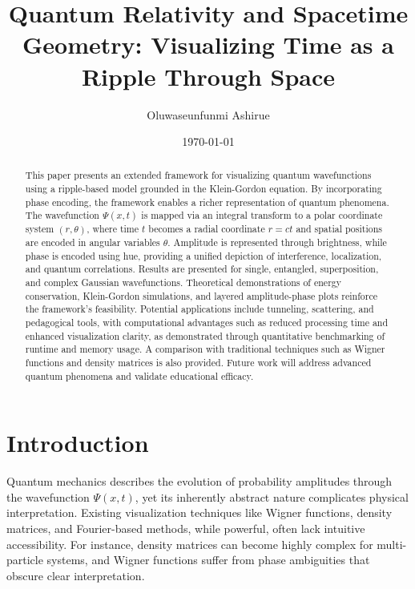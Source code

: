 \documentclass[12pt]{article}
\title{Quantum Relativity and Spacetime Geometry: Visualizing Time as a Ripple Through Space}
\author{Oluwaseunfunmi Ashirue}
\date{\today}
\begin{document}
\maketitle

\begin{abstract}
This paper presents an extended framework for visualizing quantum wavefunctions using a ripple-based model grounded in the Klein-Gordon equation. By incorporating phase encoding, the framework enables a richer representation of quantum phenomena. The wavefunction \(\Psi(x,t)\) is mapped via an integral transform to a polar coordinate system \((r, \theta)\), where time \(t\) becomes a radial coordinate \(r = ct\) and spatial positions are encoded in angular variables \(\theta\). Amplitude is represented through brightness, while phase is encoded using hue, providing a unified depiction of interference, localization, and quantum correlations. Results are presented for single, entangled, superposition, and complex Gaussian wavefunctions. Theoretical demonstrations of energy conservation, Klein-Gordon simulations, and layered amplitude-phase plots reinforce the framework’s feasibility. Potential applications include tunneling, scattering, and pedagogical tools, with computational advantages such as reduced processing time and enhanced visualization clarity, as demonstrated through quantitative benchmarking of runtime and memory usage. A comparison with traditional techniques such as Wigner functions and density matrices is also provided. Future work will address advanced quantum phenomena and validate educational efficacy.
\end{abstract}

\tableofcontents

\section{Introduction}
Quantum mechanics describes the evolution of probability amplitudes through the wavefunction \(\Psi(x,t)\), yet its inherently abstract nature complicates physical interpretation. Existing visualization techniques like Wigner functions, density matrices, and Fourier-based methods, while powerful, often lack intuitive accessibility. For instance, density matrices can become highly complex for multi-particle systems, and Wigner functions suffer from phase ambiguities that obscure clear interpretation.
\end{document}
